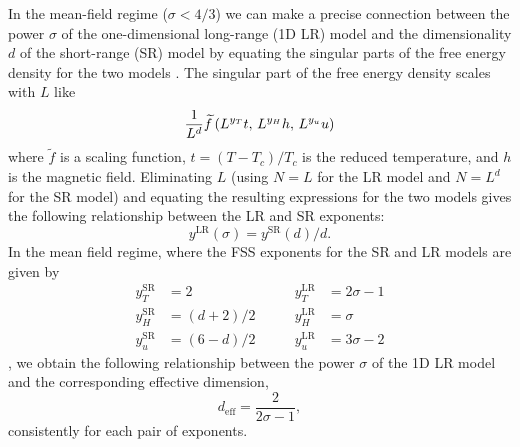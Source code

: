 In the mean-field regime ($\sigma<4/3$) we can make a precise connection
between the power $\sigma$ of the one-dimensional long-range (1D LR) model and
the dimensionality $d$ of the short-range (SR) model by equating the singular
parts of the free energy density for the two models
\autocite{larson2010numerical}. The singular part of the free energy density
scales with $L$ like
\begin{equation}
  \frac{1}{L^d} \widetilde{f} \left(L^{y_T} t,\, L^{y_H} h,\, L^{y_u} u\right)
\end{equation}
where $\widetilde{f}$ is a scaling function, $t=(T-T_c)/T_c$ is the reduced
temperature, and $h$ is the magnetic field. Eliminating $L$ (using $N=L$ for
the LR model and $N=L^d$ for the SR model) and equating the resulting
expressions for the two models gives the following relationship between the LR
and SR exponents:
\begin{equation}
  y^{\mathrm{LR}}(\sigma) = y^{\mathrm{SR}}(d)/d.
\end{equation}
In the mean field regime, where the FSS exponents for the SR and LR models are
given by
\begin{equation*}
  \begin{split}
    y_T^{\mathrm{SR}} &= 2 \\
    y_H^{\mathrm{SR}} &= (d+2)/2 \\
    y_u^{\mathrm{SR}} &= (6-d)/2
  \end{split}
  \qquad
  \begin{split}
    y_T^{\mathrm{LR}} &= 2\sigma - 1 \\
    y_H^{\mathrm{LR}} &= \sigma \\
    y_u^{\mathrm{LR}} &= 3\sigma - 2
  \end{split}
\end{equation*}
\autocite{harris1976critical,kotliar1983one}, we obtain the following
relationship between the power $\sigma$ of the 1D LR model and the
corresponding effective dimension,
\begin{equation}
  d_{\mathrm{eff}} = \frac{2}{2\sigma - 1},
\end{equation}
consistently for each pair of exponents.

